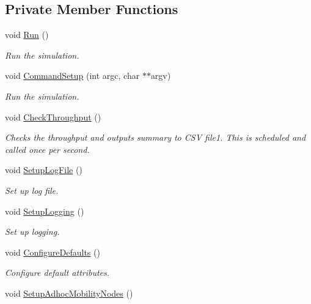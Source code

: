 \subsection*{Private Member Functions}
\begin{DoxyCompactItemize}
\item 
void \hyperlink{classVanetRoutingExperiment_a603c3d73ea69a382459f446dfdef4833}{Run} ()
\begin{DoxyCompactList}\small\item\em Run the simulation. \end{DoxyCompactList}\item 
void \hyperlink{classVanetRoutingExperiment_a6faaa1c235b5a015a5896be6fe6e6903}{Command\+Setup} (int argc, char $\ast$$\ast$argv)
\begin{DoxyCompactList}\small\item\em Run the simulation. \end{DoxyCompactList}\item 
void \hyperlink{classVanetRoutingExperiment_a8677a520984328c4fa300618116b316d}{Check\+Throughput} ()
\begin{DoxyCompactList}\small\item\em Checks the throughput and outputs summary to C\+SV file1. This is scheduled and called once per second. \end{DoxyCompactList}\item 
void \hyperlink{classVanetRoutingExperiment_ac1835febb6bbf3053d859e8e2e968b54}{Setup\+Log\+File} ()
\begin{DoxyCompactList}\small\item\em Set up log file. \end{DoxyCompactList}\item 
void \hyperlink{classVanetRoutingExperiment_a8ee7d33cac699179f14d4d4335eec563}{Setup\+Logging} ()
\begin{DoxyCompactList}\small\item\em Set up logging. \end{DoxyCompactList}\item 
void \hyperlink{classVanetRoutingExperiment_a0d891d71129321919e617f084458a1ce}{Configure\+Defaults} ()
\begin{DoxyCompactList}\small\item\em Configure default attributes. \end{DoxyCompactList}\item 
void \hyperlink{classVanetRoutingExperiment_acf2df13ed0e08bde0c167bf12cd63bd9}{Setup\+Adhoc\+Mobility\+Nodes} ()
$$
\end{DoxyCompactItemize}

